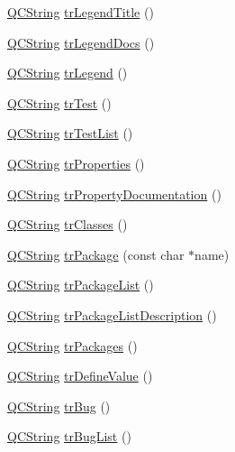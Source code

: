 \begin{DoxyCompactItemize}
\item 
\hyperlink{class_q_c_string}{Q\-C\-String} \hyperlink{class_translator_dutch_a7f4f24b82bfe41aeccff7758ce877838}{tr\-Legend\-Title} ()
\item 
\hyperlink{class_q_c_string}{Q\-C\-String} \hyperlink{class_translator_dutch_a36810de513b643c28c93dd0873812891}{tr\-Legend\-Docs} ()
\item 
\hyperlink{class_q_c_string}{Q\-C\-String} \hyperlink{class_translator_dutch_ac9030d6b3e6b640a112dcb18298f4494}{tr\-Legend} ()
\item 
\hyperlink{class_q_c_string}{Q\-C\-String} \hyperlink{class_translator_dutch_a9a6cd1fdbadb3328f2a1158928d84d6e}{tr\-Test} ()
\item 
\hyperlink{class_q_c_string}{Q\-C\-String} \hyperlink{class_translator_dutch_ab52ca375095ff8ebc3132b990b37a796}{tr\-Test\-List} ()
\item 
\hyperlink{class_q_c_string}{Q\-C\-String} \hyperlink{class_translator_dutch_a348be0b8c409fa4e85616371607b7004}{tr\-Properties} ()
\item 
\hyperlink{class_q_c_string}{Q\-C\-String} \hyperlink{class_translator_dutch_a16bfcde8c29fbffd868786e0488702d9}{tr\-Property\-Documentation} ()
\item 
\hyperlink{class_q_c_string}{Q\-C\-String} \hyperlink{class_translator_dutch_ad9265606483ae43915ab9e95e6e5aa12}{tr\-Classes} ()
\item 
\hyperlink{class_q_c_string}{Q\-C\-String} \hyperlink{class_translator_dutch_a3c1ec59b05a4e63198ddfef483791abe}{tr\-Package} (const char $\ast$name)
\item 
\hyperlink{class_q_c_string}{Q\-C\-String} \hyperlink{class_translator_dutch_a43fa374f92842b95848979807231dce4}{tr\-Package\-List} ()
\item 
\hyperlink{class_q_c_string}{Q\-C\-String} \hyperlink{class_translator_dutch_a17b6de245819913c6b2c6d70475f7bd1}{tr\-Package\-List\-Description} ()
\item 
\hyperlink{class_q_c_string}{Q\-C\-String} \hyperlink{class_translator_dutch_a3cd37685c3d82cc1ad421b4dda05544f}{tr\-Packages} ()
\item 
\hyperlink{class_q_c_string}{Q\-C\-String} \hyperlink{class_translator_dutch_a125ee798468a3f565b5fc8b0cf4df001}{tr\-Define\-Value} ()
\item 
\hyperlink{class_q_c_string}{Q\-C\-String} \hyperlink{class_translator_dutch_a79dc31f67e5cf5027af91101ff4b3b6c}{tr\-Bug} ()
\item 
\hyperlink{class_q_c_string}{Q\-C\-String} \hyperlink{class_translator_dutch_a867954853c6b0300b41680d705e285c3}{tr\-Bug\-List} ()

\end{DoxyCompactItemize}
